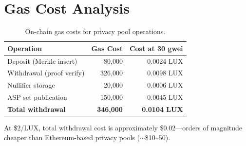 \section{Gas Cost Analysis}
\label{sec:gas}

\begin{table}[H]
\centering
\caption{On-chain gas costs for privacy pool operations.}
\label{tab:gas}
\begin{tabular}{lrr}
\toprule
\textbf{Operation} & \textbf{Gas Cost} & \textbf{Cost at 30 gwei} \\
\midrule
Deposit (Merkle insert) & 80,000 & 0.0024 LUX \\
Withdrawal (proof verify) & 326,000 & 0.0098 LUX \\
Nullifier storage & 20,000 & 0.0006 LUX \\
ASP set publication & 150,000 & 0.0045 LUX \\
\midrule
\textbf{Total withdrawal} & \textbf{346,000} & \textbf{0.0104 LUX} \\
\bottomrule
\end{tabular}
\end{table}

At \$2/LUX, total withdrawal cost is approximately \$0.02---orders of magnitude cheaper than Ethereum-based privacy pools ($\sim$\$10--50).


